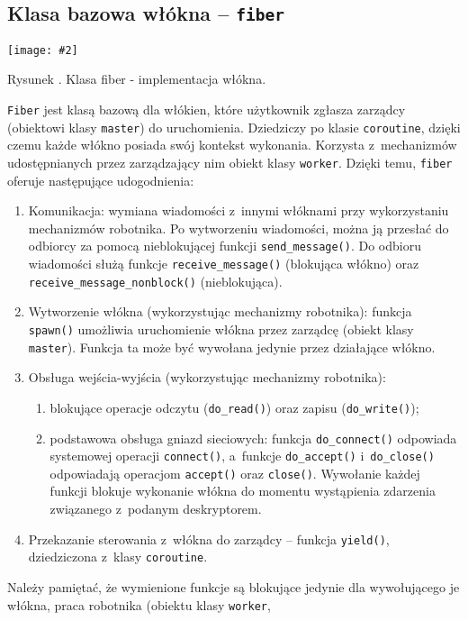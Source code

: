 \documentclass[12pt]{mwart}
\newcommand{\code}{\texttt}
\newcommand{\procbr}{()}
\newcommand{\function}[1]{\code{#1\procbr}}
\newcounter{figmain}
\newcommand{\myownfigure}[4]{ \newcounter{#1} \setcounter{#1}{\value{figmain}} \addtocounter{figmain}{1} \begin{center} \label{fig:#1} \centering \texttt{[image: \#2]}\\ \nopagebreak[5] \parbox[t]{11.5cm}{Rysunek \arabic{#1}. #3.} \end{center}}
\begin{document}
\subsection{Klasa bazowa włókna -- \code{fiber}}
\label{sec:fibersClass}
    \myownfigure{Fiber}{Fiber.png}{Klasa fiber - implementacja włókna}{.7}
%
\indent
  \code{Fiber} jest klasą bazową dla włókien, które użytkownik zgłasza zarządcy (obiektowi klasy \code{master}) do uruchomienia. Dziedziczy po klasie \code{coroutine},
  dzięki czemu każde włókno posiada swój kontekst wykonania. Korzysta z~mechanizmów udostępnianych przez zarządzający nim obiekt klasy \code{worker}.
  Dzięki temu, \code{fiber} oferuje następujące udogodnienia:
  \begin{enumerate}
    \item Komunikacja: wymiana wiadomości z~innymi włóknami przy wykorzystaniu mechanizmów robotnika. 
      Po wytworzeniu wiadomości, można ją przesłać do odbiorcy za pomocą nieblokującej funkcji \function{send\_message}.
      Do odbioru wiadomości służą funkcje \linebreak \function{receive\_message} (blokująca włókno) oraz \function{receive\_message\_nonblock} (nieblokująca).
    \item Wytworzenie włókna (wykorzystując mechanizmy robotnika): funkcja \function{spawn} umożliwia uruchomienie włókna przez zarządcę (obiekt klasy \code{master}).
      Funkcja ta może być wywołana jedynie przez działające włókno.
    \item Obsługa wejścia-wyjścia (wykorzystując mechanizmy robotnika):
      \begin{enumerate}
        \item blokujące operacje odczytu (\function{do\_read}) oraz zapisu (\function{do\_write});
        \item podstawowa obsługa gniazd sieciowych: funkcja \function{do\_connect} odpowiada systemowej operacji \function{connect}, a~funkcje \function{do\_accept} 
          \linebreak i~\function{do\_close} odpowiadają operacjom \function{accept} oraz \function{close}. Wywołanie każdej funkcji blokuje wykonanie włókna do momentu wystąpienia  
          zdarzenia związanego z~podanym deskryptorem.
      \end{enumerate}
    \item Przekazanie sterowania z~włókna do zarządcy -- funkcja \function{yield}, dziedziczona z~klasy \code{coroutine}.
  \end{enumerate}
  Należy pamiętać, że wymienione funkcje są blokujące jedynie dla wywołującego je włókna, praca robotnika (obiektu klasy \code{worker}, 
\end{document}
